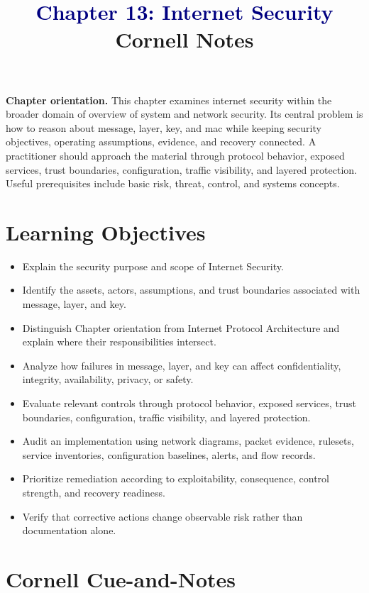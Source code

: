 \documentclass[11pt]{article}
\title{\textcolor{Navy}{Chapter 13: Internet Security}\\[2mm]\large Cornell Notes}
\author{}
\date{}
\begin{document}
\maketitle
\thispagestyle{fancy}
\vspace{-1.5em}
\begin{orientationbox}
\textbf{Chapter orientation.} This chapter examines internet security within the broader domain of overview of system and network security. Its central problem is how to reason about message, layer, key, and mac while keeping security objectives, operating assumptions, evidence, and recovery connected. A practitioner should approach the material through protocol behavior, exposed services, trust boundaries, configuration, traffic visibility, and layered protection. Useful prerequisites include basic risk, threat, control, and systems concepts.
\end{orientationbox}
\section*{Learning Objectives}
\begin{itemize}
\item Explain the security purpose and scope of Internet Security.
\item Identify the assets, actors, assumptions, and trust boundaries associated with message, layer, and key.
\item Distinguish Chapter orientation from Internet Protocol Architecture and explain where their responsibilities intersect.
\item Analyze how failures in message, layer, and key can affect confidentiality, integrity, availability, privacy, or safety.
\item Evaluate relevant controls through protocol behavior, exposed services, trust boundaries, configuration, traffic visibility, and layered protection.
\item Audit an implementation using network diagrams, packet evidence, rulesets, service inventories, configuration baselines, alerts, and flow records.
\item Prioritize remediation according to exploitability, consequence, control strength, and recovery readiness.
\item Verify that corrective actions change observable risk rather than documentation alone.
\end{itemize}
\section*{Cornell Cue-and-Notes}
\end{document}
